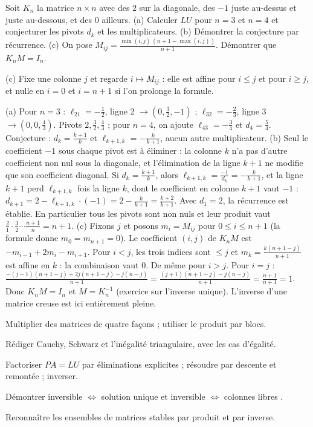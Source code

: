 \begin{exo}
Soit $K_n$ la matrice $n\times n$ avec des $2$ sur la diagonale, des $-1$ juste au-dessus et juste au-dessous, et des $0$ ailleurs. (a) Calculer $LU$ pour $n=3$ et $n=4$ et conjecturer les pivots $d_k$ et les multiplicateurs. (b) Démontrer la conjecture par récurrence. (c) On pose $M_{ij}=\frac{\min(i,j)\,(n+1-\max(i,j))}{n+1}$. Démontrer que $K_nM=I_n$.
\begin{indication}
(c) Fixe une colonne $j$ et regarde $i\mapsto M_{ij}$ : elle est affine pour $i\le j$ et pour $i\ge j$, et nulle en $i=0$ et $i=n+1$ si l'on prolonge la formule.
\end{indication}
\begin{corrige}
(a) Pour $n=3$ : $\ell_{21}=-\frac12$, ligne 2 $\to(0,\frac32,-1)$ ; $\ell_{32}=-\frac23$, ligne 3 $\to(0,0,\frac43)$. Pivots $2,\frac32,\frac43$ ; pour $n=4$, on ajoute $\ell_{43}=-\frac34$ et $d_4=\frac54$. Conjecture : $d_k=\frac{k+1}k$ et $\ell_{k+1,k}=-\frac{k}{k+1}$, aucun autre multiplicateur.
(b) Seul le coefficient $-1$ sous chaque pivot est à éliminer : la colonne $k$ n'a pas d'autre coefficient non nul sous la diagonale, et l'élimination de la ligne $k+1$ ne modifie que son coefficient diagonal. Si $d_k=\frac{k+1}k$, alors $\ell_{k+1,k}=\frac{-1}{d_k}=-\frac k{k+1}$, et la ligne $k+1$ perd $\ell_{k+1,k}$ fois la ligne $k$, dont le coefficient en colonne $k+1$ vaut $-1$ : $d_{k+1}=2-\ell_{k+1,k}\cdot(-1)=2-\frac k{k+1}=\frac{k+2}{k+1}$. Avec $d_1=2$, la récurrence est établie. En particulier tous les pivots sont non nuls et leur produit vaut $\frac21\cdot\frac32\cdots\frac{n+1}n=n+1$.
(c) Fixons $j$ et posons $m_i=M_{ij}$ pour $0\le i\le n+1$ (la formule donne $m_0=m_{n+1}=0$). Le coefficient $(i,j)$ de $K_nM$ est $-m_{i-1}+2m_i-m_{i+1}$. Pour $i<j$, les trois indices sont $\le j$ et $m_k=\frac{k(n+1-j)}{n+1}$ est affine en $k$ : la combinaison vaut $0$. De même pour $i>j$. Pour $i=j$ : $\frac{-(j-1)(n+1-j)+2j(n+1-j)-j(n-j)}{n+1}=\frac{(j+1)(n+1-j)-j(n-j)}{n+1}=\frac{n+1}{n+1}=1$. Donc $K_nM=I_n$ et $M=K_n^{-1}$ (exercice sur l'inverse unique). L'inverse d'une matrice creuse est ici entièrement pleine.
\end{corrige}
\end{exo}

\begin{bilan}
\item Multiplier des matrices de quatre façons ; utiliser le produit par blocs.
\item Rédiger Cauchy, Schwarz et l'inégalité triangulaire, avec les cas d'égalité.
\item Factoriser $PA=LU$ par éliminations explicites ; résoudre par descente et remontée ; inverser.
\item Démontrer \og inversible $\iff$ solution unique \fg{} et \og inversible $\iff$ colonnes libres \fg.
\item Reconnaître les ensembles de matrices stables par produit et par inverse.
\end{bilan}
